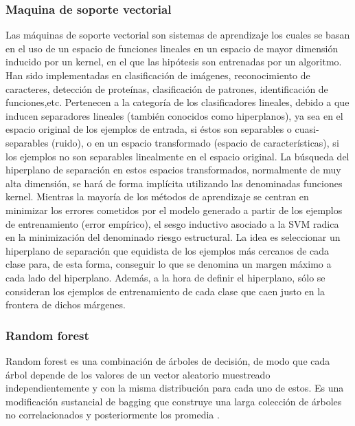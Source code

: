 
\subsubsection{Maquina de soporte vectorial}

Las máquinas de soporte vectorial son sistemas de aprendizaje los
cuales se basan en el uso de un espacio de funciones lineales en un espacio de mayor dimensión inducido
por un kernel, en el que las hipótesis son entrenadas por un algoritmo\citep{CT8}.
Han sido implementadas en clasificación de imágenes, reconocimiento de caracteres, detección de
proteínas, clasificación de patrones, identificación de funciones,etc.
Pertenecen a la categoría de los clasificadores lineales, debido a que inducen separadores lineales
(también conocidos como hiperplanos), ya sea en el espacio original de los ejemplos de entrada, si éstos son separables o cuasi-separables (ruido), o en un espacio transformado (espacio de características),
si los ejemplos no son separables linealmente en el espacio original. La búsqueda del hiperplano
de separación en estos espacios transformados, normalmente de muy alta dimensión, se hará de forma
implícita utilizando las denominadas funciones kernel. Mientras la mayoría de los métodos de aprendizaje
se centran en minimizar los errores cometidos por el modelo generado a partir de los ejemplos
de entrenamiento (error empírico), el sesgo inductivo asociado a la SVM radica en la minimización
del denominado riesgo estructural.
La idea es seleccionar un hiperplano de separación que equidista de los ejemplos más cercanos de
cada clase para, de esta forma, conseguir lo que se denomina un margen máximo a cada lado del hiperplano.
Además, a la hora de definir el hiperplano, sólo se consideran los ejemplos de entrenamiento
de cada clase que caen justo en la frontera de dichos márgenes. 

\subsubsection{Random forest}
Random forest es una combinación de árboles de decisión, de modo que cada árbol depende de los valores de un vector 
aleatorio muestreado independientemente y con la misma distribución para cada uno de estos. Es una modificación sustancial de bagging que construye una 
larga colección de árboles no correlacionados y posteriormente los promedia \citep{CT9}.

